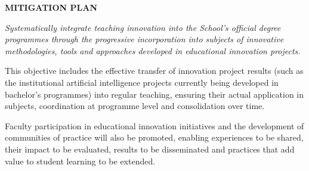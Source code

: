 \documentclass[11pt,a4paper]{scrreprt}
\begin{document}
\begin{tcolorbox}[mitbox]
{\footnotesize\sffamily\bfseries\color{green!40!black} MITIGATION PLAN}\par{}
\end{tcolorbox}
\vspace{8pt}

\newpage
{}
{\small\color{mutedcolor}\itshape Systematically integrate teaching innovation into the School's official degree programmes through the progressive incorporation into subjects of innovative methodologies, tools and approaches developed in educational innovation projects. 

This objective includes the effective transfer of innovation project results (such as the institutional artificial intelligence projects currently being developed in bachelor's programmes) into regular teaching, ensuring their actual application in subjects, coordination at programme level and consolidation over time. 

Faculty participation in educational innovation initiatives and the development of communities of practice will also be promoted, enabling experiences to be shared, their impact to be evaluated, results to be disseminated and practices that add value to student learning to be extended.  }\par\vspace{6pt}
\end{document}
